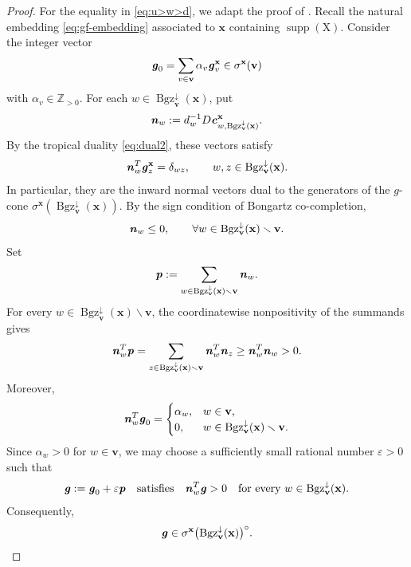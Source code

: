 \documentclass[11pt,reqno]{amsart}
\theoremstyle{plain}
\theoremstyle{definition}
\numberwithin{equation}{section}
\newcommand\ZZ{\mathbb{Z}}
\newcommand\<{\langle}
\renewcommand\>{\rangle}
\renewcommand{\setminus}{\smallsetminus}
\newcommand{\on}[1]{\operatorname{#1}}
\def\vv{\mathbf{v}}
\def\sink{X}
\newcommand{\ccpt}[1]{\mathrm{#1}}%
\def\xevo{\ccpt{X}}%
\def\con{\sigma}
\newcommand{\bfit}[1]{\textbf{\textit{#1}}}
\def\xx{\mathbf{x}}%
\def\cvec{\bfit{c}}
\def\gvec{\bfit{g}}
\def\supp{\on{supp}}
\newcommand{\Bgzm}[2]{\operatorname{Bgz}^{\downarrow}_{#2}(#1)}
\begin{document}
\begin{proof}
For the equality in \eqref{eq:u>w>d}, we adapt the proof of \cite[Thm.~7.8]{Cao}.
Recall the natural embedding \eqref{eq:gf-embedding} associated to ${\xx}$ containing $\supp(\xevo)$.
Consider the integer vector
\[
\bfit{g}_0=\sum_{v\in\vv} \alpha_v \gvec^{{\xx}}_{v}\in\sigma^{{\xx}}(\vv)
\]
with $\alpha_v\in\ZZ_{>0}$.
For each $w\in\Bgzm{\xx}{\vv}$, put
\[
    \bfit{n}_w
    :=
    d_w^{-1}D
    \cvec^{\xx}_{
        w,\Bgzm{\xx}{\vv}}.
\]
By the tropical duality \eqref{eq:dual2}, these vectors satisfy
\[
    \bfit{n}_w^{T}\gvec_z^{\xx}
    =\delta_{wz},
    \qquad
    w,z\in\Bgzm{\xx}{\vv}.
\]
In particular, they are the inward normal vectors dual to the generators of the $g$-cone $\con^{\xx}(\Bgzm{\xx}{\vv})$.
By the sign condition of Bongartz co-completion,
\[
    \bfit{n}_w\leq 0,
    \qquad
    \forall w\in
    \Bgzm{\xx}{\vv}
    \setminus\vv.
\]
Set
\[
    \bfit{p}
    :=
    \sum_{
        w\in
        \Bgzm{\xx}{\vv}
        \setminus\vv}
    \bfit{n}_w.
\]
For every
$w\in
\Bgzm{\xx}{\vv}
\setminus\vv$,
the coordinatewise nonpositivity of the summands gives
\[
    \bfit{n}_w^{T}\bfit{p}
    =
    \sum_{
        z\in
        \Bgzm{\xx}{\vv}
        \setminus\vv}
    \bfit{n}_w^{T}\bfit{n}_z
    \geq
    \bfit{n}_w^{T}\bfit{n}_w
    >0.
\]
Moreover,
\[
    \bfit{n}_w^{T}\gvec_0
    =
    \begin{cases}
        \alpha_w, & w\in\vv,\\
        0, & w\in
        \Bgzm{\xx}{\vv}
        \setminus\vv.
    \end{cases}
\]
Since $\alpha_w>0$ for $w\in\vv$, we may choose a sufficiently small rational number $\varepsilon>0$ such that
\[
    \gvec:=\gvec_0+\varepsilon\bfit{p}
    \quad\text{satisfies}\quad
    \bfit{n}_w^{T}\gvec>0
    \quad
    \text{for every }
    w\in\Bgzm{\xx}{\vv}.
\]
Consequently, 
\[
    \gvec\in\sigma^{\xx}\bigl(\Bgzm{\xx}{\vv}\bigr)^\circ.
\]


\end{proof}
\end{document}
